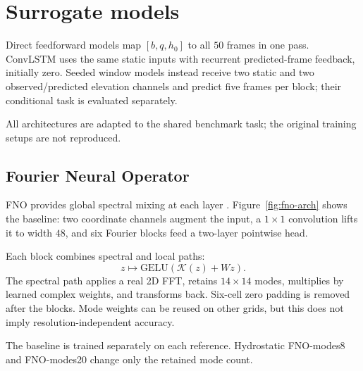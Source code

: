 \section{Surrogate models}
\label{sec:models}

Direct feedforward models map $[b,q,h_0]$ to all $50$ frames in one pass. ConvLSTM uses the same static inputs with recurrent predicted-frame feedback, initially zero. Seeded window models instead receive two static and two observed/predicted elevation channels and predict five frames per block; their conditional task is evaluated separately.

All architectures are adapted to the shared benchmark task; the original training setups are not reproduced.

\subsection{Fourier Neural Operator}
\label{subsec:fno}

FNO provides global spectral mixing at each layer \citep{li2021fno}. Figure~\ref{fig:fno-arch} shows the baseline: two coordinate channels augment the input, a $1\times1$ convolution lifts it to width $48$, and six Fourier blocks feed a two-layer pointwise head.

Each block combines spectral and local paths:
\begin{equation}
z \mapsto \mathrm{GELU}\!\left(\mathcal{K}(z) + W z\right).
\end{equation}
The spectral path applies a real 2D FFT, retains $14\times14$ modes, multiplies by learned complex weights, and transforms back. Six-cell zero padding is removed after the blocks. Mode weights can be reused on other grids, but this does not imply resolution-independent accuracy.

The baseline is trained separately on each reference. Hydrostatic FNO-modes8 and FNO-modes20 change only the retained mode count.

